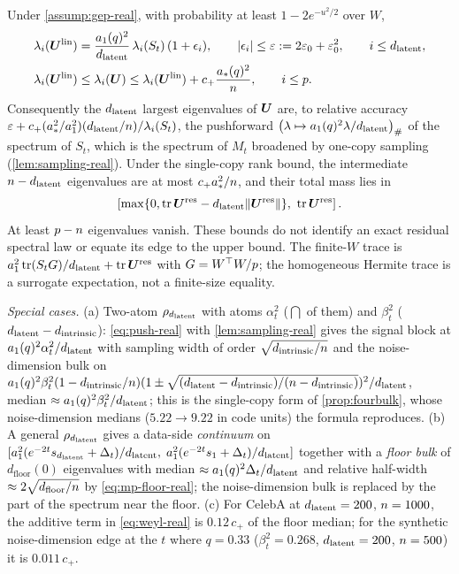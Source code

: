 \begin{proposition}\label{prop:pushforward-real}
Under \cref{assump:gep-real}, with probability at least $1-2e^{-u^2/2}$ over $W$,
\begin{align}
\lambda_i(\bm{U}^{\mathrm{lin}})&=\frac{a_1(q)^2}{d_{\mathrm{latent}}}\,\lambda_i(S_t)\,(1+\epsilon_i),\qquad |\epsilon_i|\le\varepsilon:=2\varepsilon_0+\varepsilon_0^2,\qquad i\le d_{\mathrm{latent}},\label{eq:push-real}\\
\lambda_i(\bm{U}^{\mathrm{lin}})&\le\lambda_i(\bm{U})\le\lambda_i(\bm{U}^{\mathrm{lin}})+c_+\frac{a_\ast(q)^2}{n},\qquad i\le p .\label{eq:weyl-real}
\end{align}
Consequently the $d_{\mathrm{latent}}$ largest eigenvalues of $\bm{U}$ are, to relative accuracy $\varepsilon+c_+(a_\ast^2/a_1^2)(d_{\mathrm{latent}}/n)/\lambda_i(S_t)$, the pushforward $\big(\lambda\mapsto a_1(q)^2\lambda/d_{\mathrm{latent}}\big)_\#$ of the spectrum of $S_t$, which is the spectrum of $M_t$ broadened by one-copy sampling (\cref{lem:sampling-real}). Under the single-copy rank bound, the intermediate $n-d_{\mathrm{latent}}$ eigenvalues are at most $c_+a_\ast^2/n$, and their total mass lies in
\[
\left[\max\{0,\operatorname{tr}\bm{U}^{\rm res}-d_{\mathrm{latent}}\|\bm{U}^{\rm res}\|\},\ \operatorname{tr}\bm{U}^{\rm res}\right].
\]
At least $p-n$ eigenvalues vanish. These bounds do not identify an exact residual spectral law or equate its edge to the upper bound. The finite-$W$ trace is $a_1^2\operatorname{tr}(S_tG)/d_{\mathrm{latent}}+\operatorname{tr}\bm{U}^{\rm res}$ with $G=W^\top W/p$; the homogeneous Hermite trace is a surrogate expectation, not a finite-size equality.
\end{proposition}
\emph{Special cases.} (a) Two-atom $\rho_{d_{\mathrm{latent}}}$ with atoms $\alpha_t^2$ ($\dint$ of them) and $\beta_t^2$ ($d_{\mathrm{latent}}-d_{\mathrm{intrinsic}}$): \eqref{eq:push-real} with \cref{lem:sampling-real} gives the signal block at $a_1(q)^2\alpha_t^2/d_{\mathrm{latent}}$ with sampling width of order $\sqrt{d_{\mathrm{intrinsic}}/n}$ and the noise-dimension bulk on $a_1(q)^2\beta_t^2(1-d_{\mathrm{intrinsic}}/n)(1\pm\sqrt{(d_{\mathrm{latent}}-d_{\mathrm{intrinsic}})/(n-d_{\mathrm{intrinsic}})})^2/d_{\mathrm{latent}}$, median $\approx a_1(q)^2\beta_t^2/d_{\mathrm{latent}}$; this is the single-copy form of \cref{prop:fourbulk}, whose noise-dimension medians ($5.22\to9.22$ in code units) the formula reproduces. (b) A general $\rho_{d_{\mathrm{latent}}}$ gives a data-side \emph{continuum} on $[a_1^2(e^{-2t}s_{d_{\mathrm{latent}}}+\Delta_t)/d_{\mathrm{latent}},\;a_1^2(e^{-2t}s_1+\Delta_t)/d_{\mathrm{latent}}]$ together with a \emph{floor bulk} of $d_{\mathrm{floor}}(0)$ eigenvalues with median $\approx a_1(q)^2\Delta_t/d_{\mathrm{latent}}$ and relative half-width $\approx2\sqrt{d_{\mathrm{floor}}/n}$ by \eqref{eq:mp-floor-real}; the noise-dimension bulk is replaced by the part of the spectrum near the floor. (c) For CelebA at $d_{\mathrm{latent}}=200$, $n=1000$, the additive term in \eqref{eq:weyl-real} is $0.12\,c_+$ of the floor median; for the synthetic noise-dimension edge at the $t$ where $q=0.33$ ($\beta_t^2=0.268$, $d_{\mathrm{latent}}=200$, $n=500$) it is $0.011\,c_+$.
